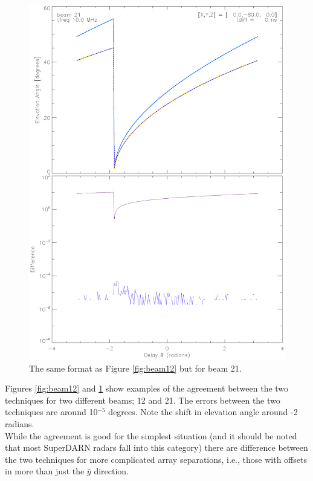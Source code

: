 \documentclass{article}
\begin{document}
\begin{figure}[tb]
\includegraphics[scale=.8]{beam21_eg.ps}
\caption{The same format as Figure \ref{fig:beam12} but for beam 21.}
\label{fig:beam21}
\end{figure}

\noindent
Figures \ref{fig:beam12} and \ref{fig:beam21} show examples of the agreement
between the two techniques for two different beams; 12 and 21. The errors
between the two techniques are around 10$^{-5}$ degrees. Note the shift in
elevation angle around -2 radians. \\

\noindent
While the agreement is good for the simplest situation (and it should be
noted that most SuperDARN radars fall into this category) there are difference
between the two techniques for more complicated array separations, i.e.,
those with offsets in more than just the $\hat{y}$ direction. \\
\end{document}
